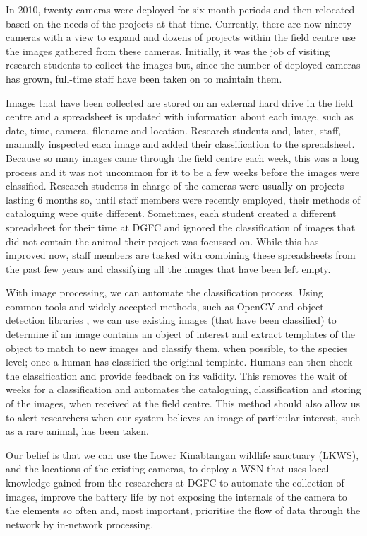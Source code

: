 In 2010, twenty cameras were deployed for six month periods and then relocated based on the needs of the projects at that time. Currently, there are now ninety cameras with a view to expand and dozens of projects within the field centre use the images gathered from these cameras. Initially, it was the job of visiting research students to collect the images but, since the number of deployed cameras has grown, full-time staff have been taken on to maintain them.

Images that have been collected are stored on an external hard drive in the field centre and a spreadsheet is updated with information about each image, such as date, time, camera, filename and location. Research students and, later, staff, manually inspected each image and added their classification to the spreadsheet. Because so many images came through the field centre each week, this was a long process and it was not uncommon for it to be a few weeks before the images were classified. Research students in charge of the cameras were usually on projects lasting 6 months so, until staff members were recently employed, their methods of cataloguing were quite different. Sometimes, each student created a different spreadsheet for their time at DGFC and ignored the classification of images that did not contain the animal their project was focussed on. While this has improved now, staff members are tasked with combining these spreadsheets from the past few years and classifying all the images that have been left empty.

With image processing, we can automate the classification process. Using common tools and widely accepted methods, such as OpenCV \cite{opencv_library} and object detection libraries \cite{cvblob}, we can use existing images (that have been classified) to determine if an image contains an object of interest and extract templates of the object to match to new images and classify them, when possible, to the species level; once a human has classified the original template. Humans can then check the classification and provide feedback on its validity. This removes the wait of weeks for a classification and automates the cataloguing, classification and storing of the images, when received at the field centre. This method should also allow us to alert researchers when our system believes an image of particular interest, such as a rare animal, has been taken.

Our belief is that we can use the Lower Kinabtangan wildlife sanctuary (LKWS), and the locations of the existing cameras, to deploy a WSN that uses local knowledge gained from the researchers at DGFC to automate the collection of images, improve the battery life by not exposing the internals of the camera to the elements so often and, most important, prioritise the flow of data through the network by in-network processing. 
	
